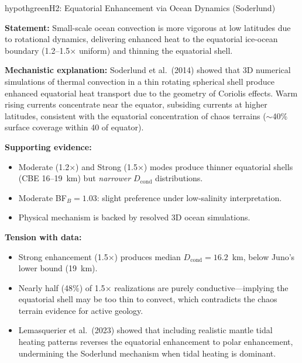 \documentclass[11pt,letterpaper]{article}
\begin{document}
\newpage
\begin{hypothesisbox}{hypothgreen}{H2: Equatorial Enhancement via Ocean Dynamics (Soderlund)}

\textbf{Statement:} Small-scale ocean convection is more vigorous at low latitudes due to rotational dynamics, delivering enhanced heat to the equatorial ice-ocean boundary (1.2--1.5$\times$ uniform) and thinning the equatorial shell.

\textbf{Mechanistic explanation:} Soderlund et al.\ (2014) showed that 3D numerical simulations of thermal convection in a thin rotating spherical shell produce enhanced equatorial heat transport due to the geometry of Coriolis effects. Warm rising currents concentrate near the equator, subsiding currents at higher latitudes, consistent with the equatorial concentration of chaos terrains ($\sim$40\% surface coverage within 40\textdegree{} of equator).

\textbf{Supporting evidence:}
\begin{itemize}[nosep]
  \item Moderate (1.2$\times$) and Strong (1.5$\times$) modes produce thinner equatorial shells (CBE 16--19~km) but \textit{narrower} $D_\mathrm{cond}$ distributions.
  \item Moderate BF$_B = 1.03$: slight preference under low-salinity interpretation.
  \item Physical mechanism is backed by resolved 3D ocean simulations.
\end{itemize}

\textbf{Tension with data:}
\begin{itemize}[nosep]
  \item Strong enhancement (1.5$\times$) produces median $D_\mathrm{cond} = 16.2$~km, below Juno's lower bound (19~km).
  \item Nearly half (48\%) of 1.5$\times$ realizations are purely conductive---implying the equatorial shell may be too thin to convect, which contradicts the chaos terrain evidence for active geology.
  \item Lemasquerier et al.\ (2023) showed that including realistic mantle tidal heating patterns reverses the equatorial enhancement to polar enhancement, undermining the Soderlund mechanism when tidal heating is dominant.
\end{itemize}
\end{hypothesisbox}
\end{document}
